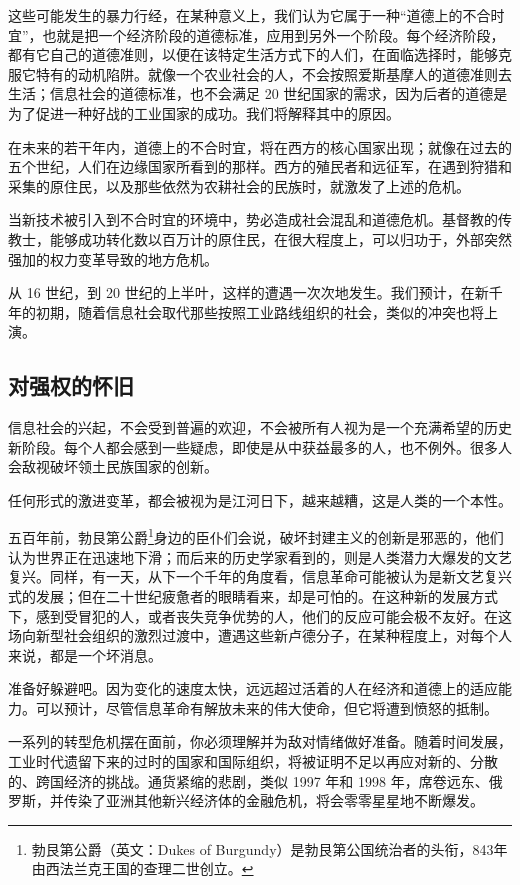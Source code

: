 这些可能发生的暴力行经，在某种意义上，我们认为它属于一种“道德上的不合时宜”，也就是把一个经济阶段的道德标准，应用到另外一个阶段。每个经济阶段，都有它自己的道德准则，以便在该特定生活方式下的人们，在面临选择时，能够克服它特有的动机陷阱。就像一个农业社会的人，不会按照爱斯基摩人的道德准则去生活；信息社会的道德标准，也不会满足 20 世纪国家的需求，因为后者的道德是为了促进一种好战的工业国家的成功。我们将解释其中的原因。


在未来的若干年内，道德上的不合时宜，将在西方的核心国家出现；就像在过去的五个世纪，人们在边缘国家所看到的那样。西方的殖民者和远征军，在遇到狩猎和采集的原住民，以及那些依然为农耕社会的民族时，就激发了上述的危机。


当新技术被引入到不合时宜的环境中，势必造成社会混乱和道德危机。基督教的传教士，能够成功转化数以百万计的原住民，在很大程度上，可以归功于，外部突然强加的权力变革导致的地方危机。


从 16 世纪，到 20 世纪的上半叶，这样的遭遇一次次地发生。我们预计，在新千年的初期，随着信息社会取代那些按照工业路线组织的社会，类似的冲突也将上演。


\subsection{对强权的怀旧}
信息社会的兴起，不会受到普遍的欢迎，不会被所有人视为是一个充满希望的历史新阶段。每个人都会感到一些疑虑，即使是从中获益最多的人，也不例外。很多人会敌视破坏领土民族国家的创新。


任何形式的激进变革，都会被视为是江河日下，越来越糟，这是人类的一个本性。


五百年前，勃艮第公爵\footnote{勃艮第公爵（英文：Dukes of Burgundy）是勃艮第公国统治者的头衔，843年由西法兰克王国的查理二世创立。}身边的臣仆们会说，破坏封建主义的创新是邪恶的，他们认为世界正在迅速地下滑；而后来的历史学家看到的，则是人类潜力大爆发的文艺复兴。同样，有一天，从下一个千年的角度看，信息革命可能被认为是新文艺复兴式的发展；但在二十世纪疲惫者的眼睛看来，却是可怕的。在这种新的发展方式下，感到受冒犯的人，或者丧失竞争优势的人，他们的反应可能会极不友好。在这场向新型社会组织的激烈过渡中，遭遇这些新卢德分子，在某种程度上，对每个人来说，都是一个坏消息。


准备好躲避吧。因为变化的速度太快，远远超过活着的人在经济和道德上的适应能力。可以预计，尽管信息革命有解放未来的伟大使命，但它将遭到愤怒的抵制。


一系列的转型危机摆在面前，你必须理解并为敌对情绪做好准备。随着时间发展，工业时代遗留下来的过时的国家和国际组织，将被证明不足以再应对新的、分散的、跨国经济的挑战。通货紧缩的悲剧，类似 1997 年和 1998 年，席卷远东、俄罗斯，并传染了亚洲其他新兴经济体的金融危机，将会零零星星地不断爆发。



